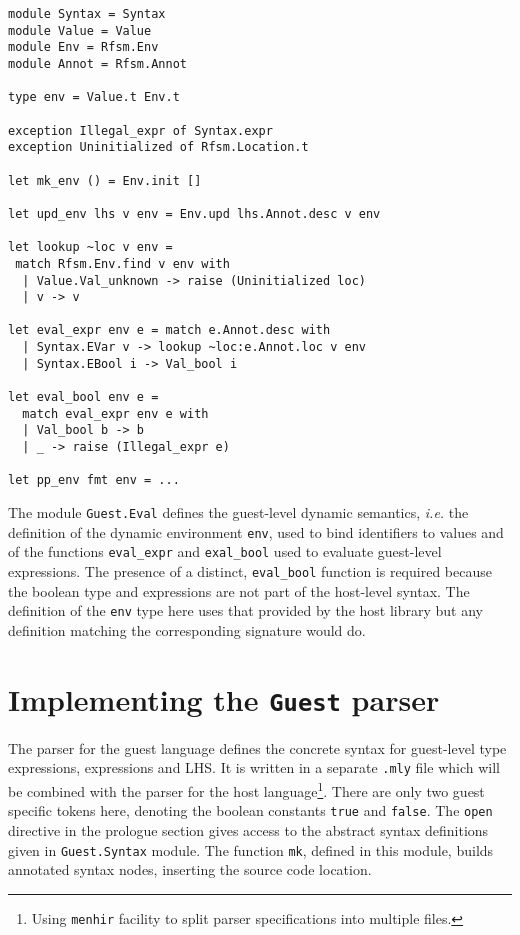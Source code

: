 \begin{lstlisting}[language={[Objective]Caml},frame=single,basicstyle=\small,caption={Module
    \texttt{Guest.Eval} (excerpt)},label={lst:mini-eval}]
module Syntax = Syntax
module Value = Value
module Env = Rfsm.Env
module Annot = Rfsm.Annot

type env = Value.t Env.t

exception Illegal_expr of Syntax.expr
exception Uninitialized of Rfsm.Location.t

let mk_env () = Env.init []

let upd_env lhs v env = Env.upd lhs.Annot.desc v env

let lookup ~loc v env = 
 match Rfsm.Env.find v env with
  | Value.Val_unknown -> raise (Uninitialized loc)
  | v -> v

let eval_expr env e = match e.Annot.desc with
  | Syntax.EVar v -> lookup ~loc:e.Annot.loc v env
  | Syntax.EBool i -> Val_bool i 

let eval_bool env e = 
  match eval_expr env e with
  | Val_bool b -> b
  | _ -> raise (Illegal_expr e) 

let pp_env fmt env = ...
\end{lstlisting}

The module \verb|Guest.Eval| defines the guest-level dynamic semantics, \emph{i.e.} the definition
of the dynamic environment \texttt{env}, used to bind identifiers to values and of the 
functions \verb|eval_expr| and \verb|exal_bool| used to evaluate guest-level expressions. The
presence of a distinct, \verb|eval_bool| function is required because the boolean type and
expressions are not part of the host-level syntax. The definition of the \texttt{env} type here uses
that provided by the host library but any definition matching the corresponding signature would do.

\section{Implementing the \texttt{Guest} parser}

The parser for the guest language defines the concrete syntax for guest-level type expressions,
expressions and LHS. It is written in a separate \texttt{.mly} file which will be combined with the
parser for the host language\footnote{Using \texttt{menhir} facility to split parser specifications
  into multiple files.}. There are only two guest specific tokens here, denoting the boolean
constants \texttt{true} and \texttt{false}. The \texttt{open} directive in the prologue section
gives access to the abstract syntax definitions given in \texttt{Guest.Syntax} module. The function
\texttt{mk}, defined in this module, builds annotated syntax nodes, inserting the source code
location. 

